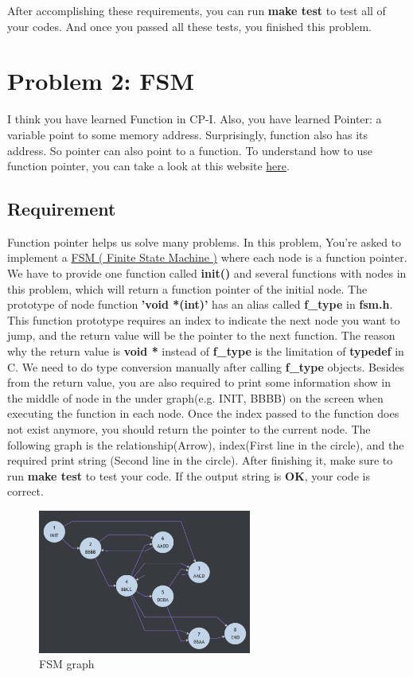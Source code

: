 \documentclass{report}
\begin{document}
After accomplishing these requirements, you can run \textbf{make test} to test all of
your codes.
And once you passed all these tests, you finished this problem.

\section{Problem 2: FSM}

I think you have learned Function in CP-I. Also, you have learned Pointer: a variable point to some memory address.
Surprisingly, function also has its address. So pointer can also point to a
function.
To understand how to use function pointer, you can take a look at this website
\href{https://chenhh.gitbooks.io/parallel_processing/content/cython/function_pointer.html}{here}.

\subsection{Requirement}

Function pointer helps us solve many problems. In this problem, You're asked to implement a
\href{https://zh.wikipedia.org/zh-tw/%E6%9C%89%E9%99%90%E7%8A%B6%E6%80%81%E6%9C%BA}{FSM
  ( Finite State Machine )} where each node is a function pointer.
We have to provide one function called \textbf{init()} and several functions with
nodes in this problem, which will return a function pointer of the initial node. The prototype of node function
\textbf{'void *(int)'} has an alias called \textbf{f\_type} in
\textbf{fsm.h}. This function prototype requires an index to indicate the next
node you want to jump, and the return
value will be the pointer to the next function. The reason why the return value is \textbf{void *}
instead of \textbf{f\_type} is the limitation of \textbf{typedef} in C.
We need to do type conversion manually after calling \textbf{f\_type} objects.
Besides from the return value, you are also required to print some information show
in the middle of node in the under graph(e.g. INIT, BBBB) on the
screen when executing the function in each node. Once the index passed to the
function does not exist anymore, you should return the pointer to the current node.
The following graph is the relationship(Arrow), index(First line in the circle),
and the required print string (Second line in the circle). After
finishing it, make sure to run \textbf{make test} to test your code. If the output string is \textbf{OK}, your code is correct.


\begin{figure}
\centering
\includegraphics[width=70mm]{graph}
\caption{FSM graph}
\label{fig:FSM}

\end{figure}
\end{document}
